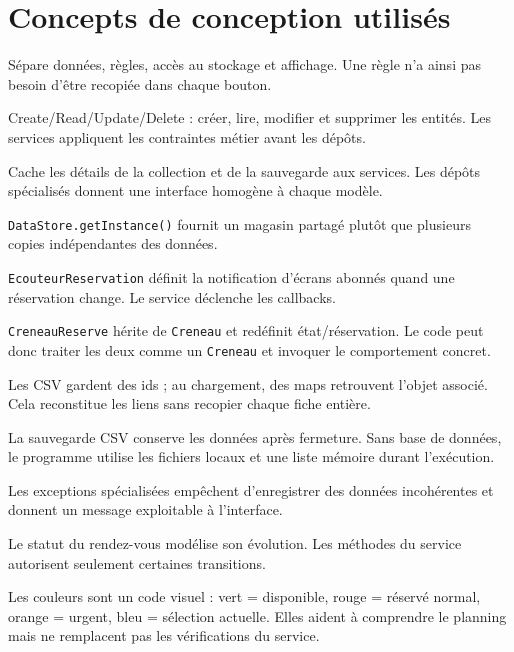 \documentclass[11pt,a4paper]{report}
\begin{document}
\chapter{Concepts de conception utilisés}
\begin{description}[leftmargin=4cm,style=nextline]
\item[Modèle--Service--Dépôt--Interface] Sépare données, règles, accès au stockage et affichage. Une règle n'a ainsi pas besoin d'être recopiée dans chaque bouton.
\item[CRUD] Create/Read/Update/Delete : créer, lire, modifier et supprimer les entités. Les services appliquent les contraintes métier avant les dépôts.
\item[Repository] Cache les détails de la collection et de la sauvegarde aux services. Les dépôts spécialisés donnent une interface homogène à chaque modèle.
\item[Singleton] \texttt{DataStore.getInstance()} fournit un magasin partagé plutôt que plusieurs copies indépendantes des données.
\item[Observateur] \texttt{EcouteurReservation} définit la notification d'écrans abonnés quand une réservation change. Le service déclenche les callbacks.
\item[Héritage et polymorphisme] \texttt{CreneauReserve} hérite de \texttt{Creneau} et redéfinit état/réservation. Le code peut donc traiter les deux comme un \texttt{Creneau} et invoquer le comportement concret.
\item[Référence par identifiant] Les CSV gardent des ids ; au chargement, des maps retrouvent l'objet associé. Cela reconstitue les liens sans recopier chaque fiche entière.
\item[Persistance] La sauvegarde CSV conserve les données après fermeture. Sans base de données, le programme utilise les fichiers locaux et une liste mémoire durant l'exécution.
\item[Validation métier] Les exceptions spécialisées empêchent d'enregistrer des données incohérentes et donnent un message exploitable à l'interface.
\item[État] Le statut du rendez-vous modélise son évolution. Les méthodes du service autorisent seulement certaines transitions.
\item[Couleurs d'état] Les couleurs sont un code visuel : vert = disponible, rouge = réservé normal, orange = urgent, bleu = sélection actuelle. Elles aident à comprendre le planning mais ne remplacent pas les vérifications du service.
\end{description}
\end{document}
